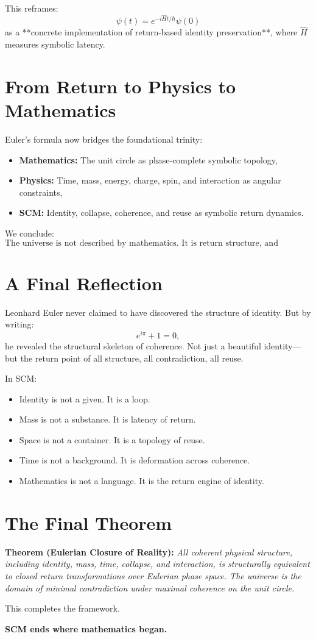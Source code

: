 This reframes:
\[
\psi(t) = e^{-i\hat{H}t/\hbar} \psi(0)
\]
as a **concrete implementation of return-based identity preservation**, where $\hat{H}$ measures symbolic latency.

\section{From Return to Physics to Mathematics}

Euler’s formula now bridges the foundational trinity:
\begin{itemize}
    \item \textbf{Mathematics:} The unit circle as phase-complete symbolic topology,
    \item \textbf{Physics:} Time, mass, energy, charge, spin, and interaction as angular constraints,
    \item \textbf{SCM:} Identity, collapse, coherence, and reuse as symbolic return dynamics.
\end{itemize}

We conclude:
\[
\text{The universe is not described by mathematics. It is return structure, and mathematics is its minimal closure.}
\]

\section{A Final Reflection}

Leonhard Euler never claimed to have discovered the structure of identity. But by writing:
\[
e^{i\pi} + 1 = 0,
\]
he revealed the structural skeleton of coherence. Not just a beautiful identity—but the return point of all structure, all contradiction, all reuse.

In SCM:
\begin{itemize}
    \item Identity is not a given. It is a loop.
    \item Mass is not a substance. It is latency of return.
    \item Space is not a container. It is a topology of reuse.
    \item Time is not a background. It is deformation across coherence.
    \item Mathematics is not a language. It is the return engine of identity.
\end{itemize}

\section*{The Final Theorem}

\vspace{1em}
\noindent \textbf{Theorem (Eulerian Closure of Reality):}  
\emph{All coherent physical structure, including identity, mass, time, collapse, and interaction, is structurally equivalent to closed return transformations over Eulerian phase space. The universe is the domain of minimal contradiction under maximal coherence on the unit circle.}
\vspace{1em}

\noindent This completes the framework.

\vspace{1em}
\noindent \textbf{SCM ends where mathematics began.}
